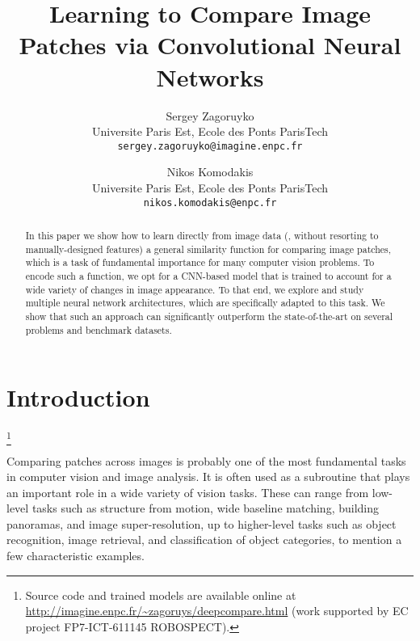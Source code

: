 \documentclass[10pt,twocolumn,letterpaper]{article}
\newcommand\blfootnote[1]{%
  \begingroup
  \renewcommand\thefootnote{}\footnote{#1}%
  \addtocounter{footnote}{-1}%
  \endgroup
}
\begin{document}
%
%
%
%

%
\title{Learning to Compare Image Patches via Convolutional Neural Networks}

\author{Sergey Zagoruyko\\
Universite Paris Est, Ecole des Ponts ParisTech\\
%
{\tt\small sergey.zagoruyko@imagine.enpc.fr}
%
%
%
%
%
\and
Nikos Komodakis\\
Universite Paris Est, Ecole des Ponts ParisTech\\
%
{\tt\small nikos.komodakis@enpc.fr}\\
}

\maketitle
%

%
\begin{abstract}
\vspace{-4pt}
In this paper we show how to learn %
directly from image data (\ie, without resorting to manually-designed features) a general similarity function for comparing image patches, which is a task of fundamental importance for many computer vision problems. To encode such a function, we  opt for  a CNN-based model that is trained to account for a wide variety of changes in image appearance. To that end, we explore and study multiple neural network architectures, which are specifically adapted to this task. We show that such an approach can significantly outperform the state-of-the-art  on several problems and benchmark datasets.
\end{abstract}

%
\vspace{-15pt}
\section{Introduction}
\blfootnote{Source code and trained models are available online at \url{http://imagine.enpc.fr/~zagoruys/deepcompare.html} (work  supported by  EC project FP7-ICT-611145 ROBOSPECT).}
Comparing patches across images is probably one of the most fundamental tasks in computer vision and image analysis. It is often used as a subroutine that plays an important role in a wide variety of vision tasks. These can range from low-level tasks such as  structure from motion, wide baseline matching, building panoramas, and image super-resolution, up to higher-level tasks such as object recognition, image retrieval, and classification of object categories, to mention a few characteristic examples. 
\end{document}
